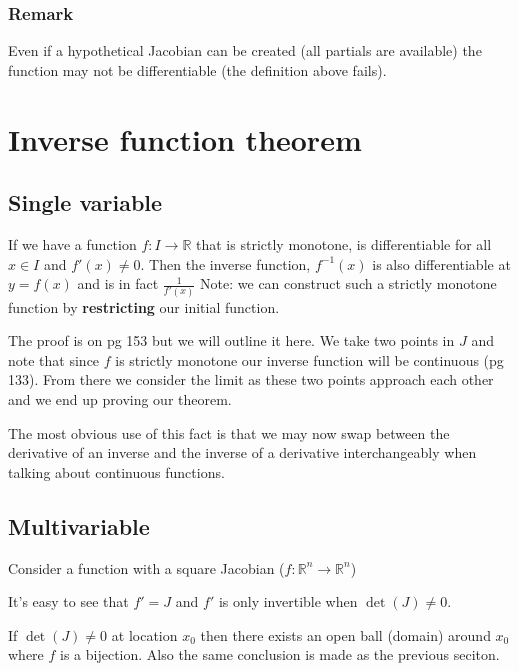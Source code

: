 \documentclass{article}
\begin{document}
\subsubsection{Remark}
Even if a hypothetical Jacobian can be created (all partials are available)
the function may not be differentiable (the definition above fails).

\section{Inverse function theorem}
\subsection{Single variable}
If we have a function $f\colon I \to \mathbb{R}$ that is strictly monotone,
is differentiable for all $x \in I$ and $f'(x) \neq 0$. Then the inverse
function, $f^{-1}(x)$ is also differentiable at $y = f(x)$ and is in fact
$\frac{1}{f'(x)}$
Note: we can construct such a strictly monotone function by
\textbf{restricting} our initial function.

The proof is on pg 153 but we will outline it here.
We take two points in $J$ and note that since $f$ is strictly monotone
our inverse function will be continuous (pg 133). From there we
consider the limit as these two points approach each other and we end up
proving our theorem.

The most obvious use of this fact is that we may now swap between
the derivative of an inverse and the inverse of a derivative interchangeably
when talking about continuous functions.

\subsection{Multivariable}
Consider a function with a square Jacobian
($f\colon \mathbb{R}^n \to \mathbb{R}^n$)

It's easy to see that $f' = J$ and $f'$ is only invertible when
$\det(J) \neq 0$.

If $\det(J) \neq 0$ at location $x_0$ then there exists an open ball (domain)
around $x_0$ where $f$ is a bijection. Also the same conclusion is made as
the previous seciton.
\end{document}
